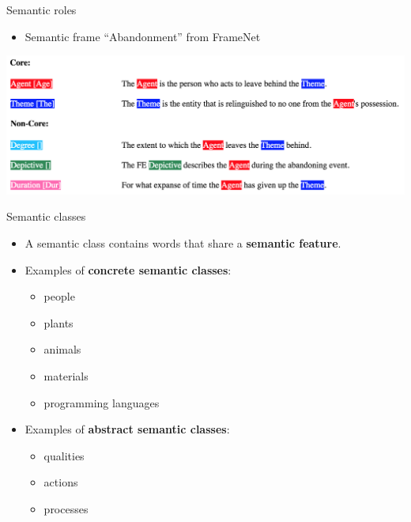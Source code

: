 \begin{frame}{Semantic roles  }

\begin{itemize}
\item Semantic frame ``Abandonment'' from FrameNet 	
\end{itemize}


	\includegraphics[width=1.0\textwidth]{figures/roles}
\end{frame}



\begin{frame}{Semantic classes  }

\begin{itemize}
\item A semantic class contains words that share a \textbf{semantic feature}.
\item Examples of \textbf{concrete semantic classes}:
\begin{itemize}
\item  people
\item  plants
\item  animals
\item  materials
\item  programming languages
\end{itemize}

\item Examples of \textbf{abstract semantic classes}: 

\begin{itemize}
\item qualities
\item actions
\item processes
\end{itemize}


  	
\end{itemize}


\end{frame}


